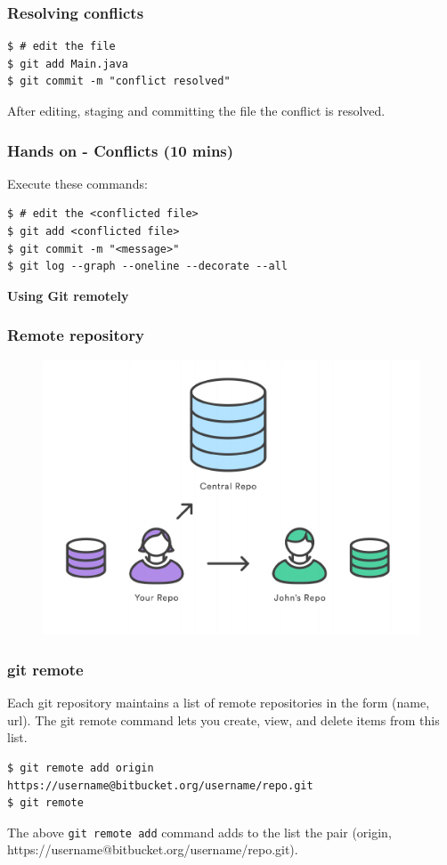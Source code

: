 \documentclass{beamer}
\begin{document}
\begin{frame}[fragile]
\frametitle{Resolving conflicts}
\begin{lstlisting}
$ # edit the file
$ git add Main.java
$ git commit -m "conflict resolved"
\end{lstlisting}
After editing, staging and committing the file
the conflict is resolved.
\end{frame}


\begin{frame}[fragile]
\frametitle{Hands on - Conflicts (10 mins)}

Execute these commands:

\begin{lstlisting}
$ # edit the <conflicted file>
$ git add <conflicted file>
$ git commit -m "<message>"
$ git log --graph --oneline --decorate --all
\end{lstlisting}
\end{frame}


\begin{frame}
\LARGE	
\textbf{Using Git remotely}
\end{frame}

\begin{frame}
\frametitle{Remote repository}

\begin{figure}
\includegraphics[scale=0.6]{figures/06.pdf}
\end{figure}

\end{frame}


\begin{frame}[fragile]
\frametitle{git remote}

Each git repository maintains a list of remote repositories in the
form (name, url).
The git remote command lets you create, view, and delete items from
this list.

\begin{lstlisting}
$ git remote add origin https://username@bitbucket.org/username/repo.git
$ git remote
\end{lstlisting}
The above \texttt{git remote add} command adds to the list the pair (origin, https://username@bitbucket.org/username/repo.git).

\end{frame}
\end{document}
